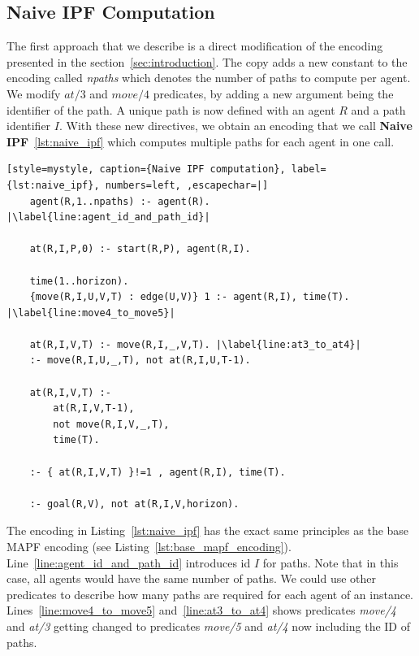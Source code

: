 \subsection{Naive IPF Computation}\label{sec:naive_ipf_computation}

The first approach that we describe is a direct modification of the encoding presented in the section~\ref{sec:introduction}. The copy adds a new constant to the encoding called \textit{npaths} which denotes the number of paths to compute per agent. We modify \(at/3\) and \(move/4\) predicates, by adding a new argument being the identifier of the path. A unique path is now defined with an agent \(R\) and a path identifier \(I\). With these new directives, we obtain an encoding that we  call \textbf{Naive IPF}~\ref{lst:naive_ipf} which computes multiple paths for each agent in one call.

\begin{minipage}[H]{\linewidth}
\begin{lstlisting}[style=mystyle, caption={Naive IPF computation}, label={lst:naive_ipf}, numbers=left, ,escapechar=|]
    agent(R,1..npaths) :- agent(R). |\label{line:agent_id_and_path_id}|
    
    at(R,I,P,0) :- start(R,P), agent(R,I).

    time(1..horizon).
    {move(R,I,U,V,T) : edge(U,V)} 1 :- agent(R,I), time(T). |\label{line:move4_to_move5}|

    at(R,I,V,T) :- move(R,I,_,V,T). |\label{line:at3_to_at4}|
    :- move(R,I,U,_,T), not at(R,I,U,T-1).

    at(R,I,V,T) :- 
        at(R,I,V,T-1), 
        not move(R,I,V,_,T),
        time(T).

    :- { at(R,I,V,T) }!=1 , agent(R,I), time(T). 

    :- goal(R,V), not at(R,I,V,horizon).
\end{lstlisting}
\end{minipage}

The encoding in Listing~\ref{lst:naive_ipf} has the exact same principles as the base MAPF encoding (see Listing~\ref{lst:base_mapf_encoding}). Line~\ref{line:agent_id_and_path_id} introduces id \(I\) for paths. Note that in this case, all agents would have the same number of paths. We could use other predicates to describe how many paths are required for each agent of an instance. Lines~\ref{line:move4_to_move5} and~\ref{line:at3_to_at4} shows predicates \textit{move/4} and \textit{at/3} getting changed to predicates \textit{move/5} and \textit{at/4} now including the ID of paths.


